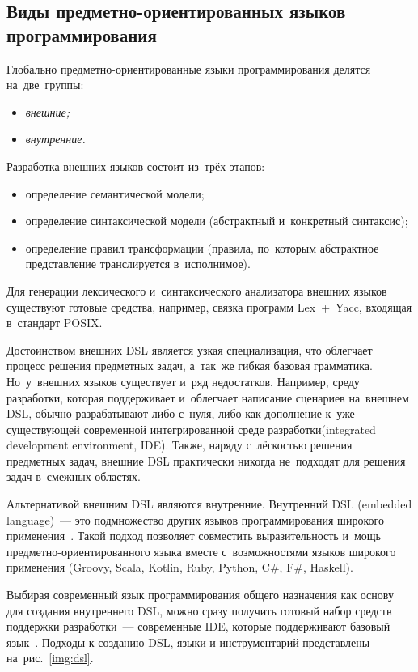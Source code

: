 \subsection{Виды предметно-ориентированных языков программирования} \label{sub122}
Глобально предметно-ориентированные языки программирования делятся на~две~группы: 
\begin{itemize} 
	\item{\textit{внешние;}}
	\item{\textit{внутренние.}}
\end{itemize}

Разработка внешних языков состоит из~трёх этапов:

\begin{itemize} 
	\item{определение семантической модели;}
	\item{определение синтаксической модели (абстрактный и~конкретный синтаксис);}
	\item{определение правил трансформации (правила, по~которым абстрактное представление транслируется в~исполнимое).}
\end{itemize}

Для генерации лексического и~синтаксического анализатора внешних языков существуют готовые средства, например, связка программ Lex~+~Yacc, входящая в~стандарт POSIX. 

Достоинством внешних DSL является узкая специализация, что облегчает процесс решения предметных задач, а~так~же гибкая базовая грамматика. Но~у~внешних языков существует и~ряд недостатков. Например, среду разработки, которая поддерживает и~облегчает написание сценариев на~внешнем DSL, обычно разрабатывают либо с~нуля, либо как дополнение к~уже существующей современной интегрированной среде разработки(integrated development environment, IDE). Также, наряду с~лёгкостью решения предметных задач, внешние DSL практически никогда не~подходят для решения задач в~смежных областях.

Альтернативой внешним DSL являются внутренние. Внутренний DSL (embedded language)~--- это подмножество других языков программирования широкого применения~\cite{VanDeursen2000}. Такой подход позволяет совместить выразительность и~мощь предметно-ориентированного языка вместе с~возможностями языков широкого применения (Groovy, Scala, Kotlin, Ruby, Python, C\#, F\#, Haskell). 

Выбирая современный язык программирования общего назначения как основу для создания внутреннего DSL, можно сразу получить готовый набор средств поддержки разработки~--- современные IDE, которые поддерживают базовый язык~\cite{Botov}. Подходы к созданию DSL, языки и инструментарий представлены на~рис.~\ref{img:dsl}.

